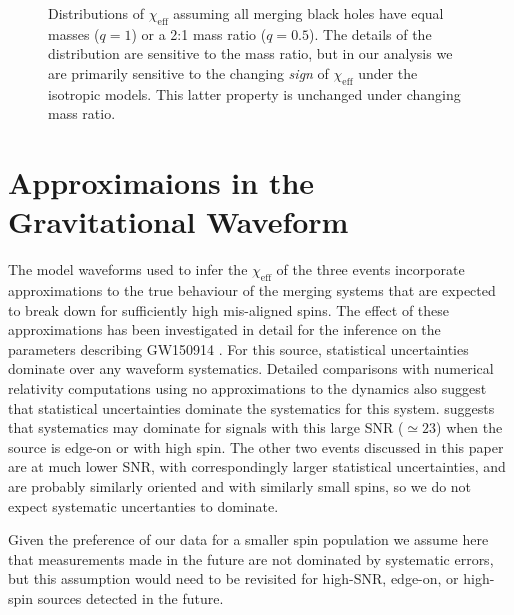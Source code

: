 \documentclass[modern,linenumbers]{aastex61}
\newcommand{\chieff}{\chi_\mathrm{eff}}
\begin{document}
\begin{figure}
  \caption{Distributions of $\chieff$ assuming all merging black holes
    have equal masses ($q=1$) or a 2:1 mass ratio ($q = 0.5$).  The
    details of the distribution are sensitive to the mass ratio, but
    in our analysis we are primarily sensitive to the changing
    \emph{sign} of $\chieff$ under the isotropic models.  This latter
    property is unchanged under changing mass ratio.}
  \label{fig:mass-ratio-sensitivity}
\end{figure}

\section{Approximaions in the Gravitational Waveform}
The model waveforms used to infer the $\chieff$ of the three events
incorporate approximations to the true behaviour of the merging
systems that are expected to break down for sufficiently high
mis-aligned spins.  The effect of these approximations has been
investigated in detail for the inference on the parameters describing
GW150914 \citep{2016arXiv161107531T}.  For this source, statistical
uncertainties dominate over any waveform systematics.  Detailed
comparisons with numerical relativity computations using no
approximations to the dynamics \citep{2016PhRvD..94f4035A} also
suggest that statistical uncertainties dominate the systematics for
this system.  \citet{2016arXiv161107531T} suggests that systematics
may dominate for signals with this large SNR ($\simeq 23$) when the
source is edge-on or with high spin.  The other two events discussed
in this paper are at much lower SNR, with correspondingly larger
statistical uncertainties, and are probably similarly oriented and
with similarly small spins, so we do not expect systematic
uncertanties to dominate.  

Given the preference of our data for a smaller spin population we
assume here that measurements made in the future are not dominated by
systematic errors, but this assumption would need to be revisited for
high-SNR, edge-on, or high-spin sources detected in the future.


\end{document}
